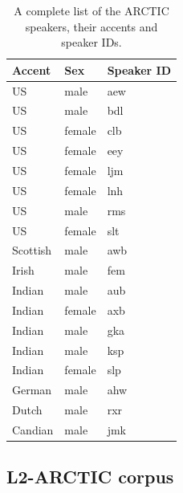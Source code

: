 \documentclass
[
    a4paper,
    twoside,
    12pt,
]
{report}
\begin{document}
\begin{table}[]
\centering
\begin{tabular}{|l|l|l|}
\hline
\textbf{Accent} & \textbf{Sex} & \textbf{Speaker ID} \\ \hline
US              & male         & aew                 \\ \hline
US              & male         & bdl                 \\ \hline
US              & female       & clb                 \\ \hline
US              & female       & eey                 \\ \hline
US              & female       & ljm                 \\ \hline
US              & female       & lnh                 \\ \hline
US              & male         & rms                 \\ \hline
US              & female       & slt                 \\ \hline
Scottish        & male         & awb                 \\ \hline
Irish           & male         & fem                 \\ \hline
Indian          & male         & aub                 \\ \hline
Indian          & female       & axb                 \\ \hline
Indian          & male         & gka                 \\ \hline
Indian          & male         & ksp                 \\ \hline
Indian          & female       & slp                 \\ \hline
German          & male         & ahw                 \\ \hline
Dutch           & male         & rxr                 \\ \hline
Candian         & male         & jmk                 \\ \hline
\end{tabular}
\caption{A complete list of the ARCTIC speakers, their accents and speaker IDs.}
\label{table:cmu-arctic-speakers}
\end{table}

\hypertarget{l2-arctic-corpus}{%
\subsection{L2-ARCTIC corpus}\label{l2-arctic-corpus}}
\end{document}
